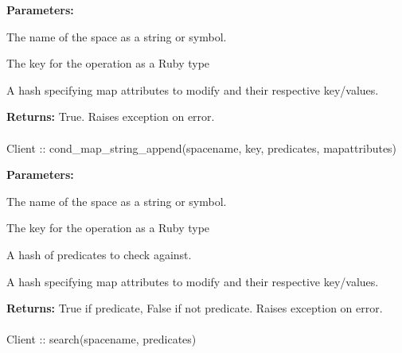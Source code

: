 \noindent\textbf{Parameters:}
\begin{description}[labelindent=\widthof{{\code{mapattributes}}},leftmargin=*,noitemsep,nolistsep,align=right]
\item[\code{spacename}] The name of the space as a string or symbol.
\item[\code{key}] The key for the operation as a Ruby type
\item[\code{mapattributes}] A hash specifying map attributes to modify and their respective key/values.
\end{description}

\noindent\textbf{Returns:}
True.  Raises exception on error.

\paragraph{}
\label{api:ruby:cond_map_string_append}
\begin{ccode}
Client :: cond_map_string_append(spacename, key, predicates, mapattributes)
\end{ccode}
\funcdesc 

\noindent\textbf{Parameters:}
\begin{description}[labelindent=\widthof{{\code{mapattributes}}},leftmargin=*,noitemsep,nolistsep,align=right]
\item[\code{spacename}] The name of the space as a string or symbol.
\item[\code{key}] The key for the operation as a Ruby type
\item[\code{predicates}] A hash of predicates to check against.
\item[\code{mapattributes}] A hash specifying map attributes to modify and their respective key/values.
\end{description}

\noindent\textbf{Returns:}
True if predicate, False if not predicate.  Raises exception on error.

\paragraph{}
\label{api:ruby:search}
\begin{ccode}
Client :: search(spacename, predicates)
\end{ccode}
\funcdesc 

